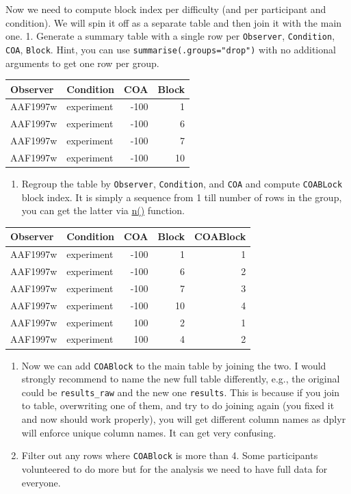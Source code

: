 \documentclass[
]{book}
\providecommand{\tightlist}{%
  \setlength{\itemsep}{0pt}\setlength{\parskip}{0pt}}
\begin{document}
Now we need to compute block index per difficulty (and per participant and condition). We will spin it off as a separate table and then join it with the main one.
1. Generate a summary table with a single row per \texttt{Observer}, \texttt{Condition}, \texttt{COA}, \texttt{Block}. Hint, you can use \texttt{summarise(.groups="drop")} with no additional arguments to get one row per group.

\begin{tabular}{l|l|r|r}
\hline
Observer & Condition & COA & Block\\
\hline
AAF1997w & experiment & -100 & 1\\
\hline
AAF1997w & experiment & -100 & 6\\
\hline
AAF1997w & experiment & -100 & 7\\
\hline
AAF1997w & experiment & -100 & 10\\
\hline
\end{tabular}

\begin{enumerate}
\def\labelenumi{\arabic{enumi}.}
\setcounter{enumi}{1}
\tightlist
\item
  Regroup the table by \texttt{Observer}, \texttt{Condition}, and \texttt{COA} and compute \texttt{COABLock} block index. It is simply a sequence from 1 till number of rows in the group, you can get the latter via \href{https://dplyr.tidyverse.org/reference/n.html}{n()} function.
\end{enumerate}

\begin{tabular}{l|l|r|r|r}
\hline
Observer & Condition & COA & Block & COABlock\\
\hline
AAF1997w & experiment & -100 & 1 & 1\\
\hline
AAF1997w & experiment & -100 & 6 & 2\\
\hline
AAF1997w & experiment & -100 & 7 & 3\\
\hline
AAF1997w & experiment & -100 & 10 & 4\\
\hline
AAF1997w & experiment & 100 & 2 & 1\\
\hline
AAF1997w & experiment & 100 & 4 & 2\\
\hline
\end{tabular}

\begin{enumerate}
\def\labelenumi{\arabic{enumi}.}
\setcounter{enumi}{2}
\tightlist
\item
  Now we can add \texttt{COABlock} to the main table by joining the two. I would strongly recommend to name the new full table differently, e.g., the original could be \texttt{results\_raw} and the new one \texttt{results}. This is because if you join to table, overwriting one of them, and try to do joining again (you fixed it and now should work properly), you will get different column names as dplyr will enforce unique column names. It can get very confusing.
\item
  Filter out any rows where \texttt{COABlock} is more than 4. Some participants volunteered to do more but for the analysis we need to have full data for everyone.
\end{enumerate}
\end{document}
